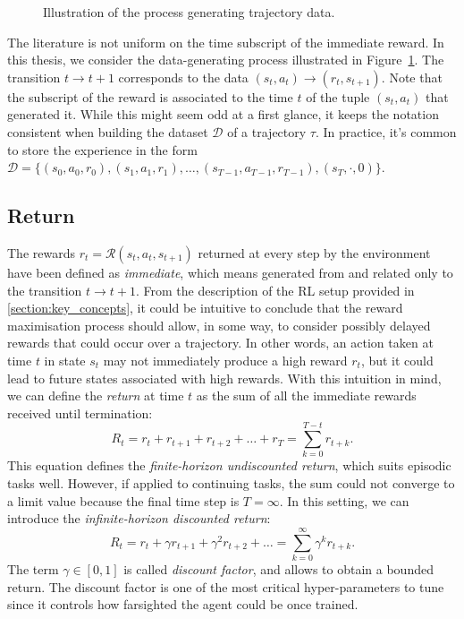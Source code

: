 \begin{figure}
    \centering
    \caption{Illustration of the process generating trajectory data.}
    \label{fig:data_generating_process_mdp}
\end{figure}

\begin{remark*}
%
The literature is not uniform on the time subscript of the immediate reward.
In this thesis, we consider the data-generating process illustrated in Figure~\ref{fig:data_generating_process_mdp}.
The transition $t \rightarrow t+1$ corresponds to the data $(s_t, a_t) \rightarrow (r_t, s_{t+1})$.
Note that the subscript of the reward is associated to the time $t$ of the tuple $(s_t, a_t)$ that generated it.
While this might seem odd at a first glance, it keeps the notation consistent when building the dataset $\mathcal{D}$ of a trajectory $\tau$.
In practice, it's common to store the experience in the form $\mathcal{D} = \{(s_0, a_0, r_0), (s_1, a_1, r_1), \dots, (s_{T-1}, a_{T-1}, r_{T-1}), (s_T, \cdot, 0)\}$.
%
\end{remark*}

\subsection{Return}

The rewards $r_t = \mathcal{R}(s_t, a_t, s_{t+1})$ returned at every step by the environment have been defined as \emph{immediate}, which means generated from and related only to the transition $t \rightarrow t+1$.
From the description of the \ac{RL} setup provided in \ref{section:key_concepts}, it could be intuitive to conclude that the reward maximisation process should allow, in some way, to consider possibly delayed rewards that could occur over a trajectory.
In other words, an action taken at time $t$ in state $s_t$ may not immediately produce a high reward $r_t$, but it could lead to future states associated with high rewards.
With this intuition in mind, we can define the \emph{return} at time $t$ as the sum of all the immediate rewards received until termination:
%
\begin{equation*}
    R_t = r_t + r_{t+1} + r_{t+2} + \dots + r_T = \sum_{k=0}^{T - t} r_{t+k} .
\end{equation*}
%
This equation defines the \emph{finite-horizon undiscounted return}, which suits episodic tasks well.
However, if applied to continuing tasks, the sum could not converge to a limit value because the final time step is $T=\infty$.
In this setting, we can introduce the \emph{infinite-horizon discounted return}:
%
\begin{equation*}
    R_t = r_t + \gamma r_{t+1} + \gamma^2 r_{t+2} + \dots = \sum_{k=0}^{\infty} \gamma^k r_{t+k} .
\end{equation*}
%
The term $\gamma \in [0, 1]$ is called \emph{discount factor}, and allows to obtain a bounded return.
The discount factor is one of the most critical hyper-parameters to tune since it controls how farsighted the agent could be once trained.

